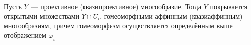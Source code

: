  	\begin{corollary}
 		Пусть $Y$~--- проективное (квазипроективное) многообразие. Тогда $Y$ покрывается открытыми множествами $Y \cap U_i$, гомеоморфными аффинным (квазиаффинным) многообразиям, причем гомеоморфизм осуществляется определённым выше отображением $\varphi_i$.
 	\end{corollary}



	

 	









